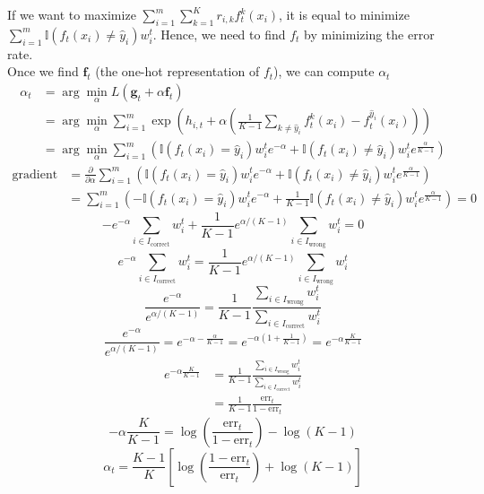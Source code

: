 \documentclass[12pt,a4paper]{article}
\begin{document}
If we want to maximize $\sum_{i=1}^{m}\sum_{k=1}^{K}r_{i,k}f_{t}^{k}(x_i)$, it is equal to minimize $\sum_{i=1}^{m} \mathbb{I} (f_{t}(x_i)\neq \hat{y}_{i})w_{i}^{t}$. 
Hence, we need to find $f_{t}$ by minimizing the error rate.\\
Once we find $\mathbf{f}_{t}$ (the one-hot representation of $f_{t}$), we can compute $\alpha_{t}$
\begin{equation*}
    \begin{split}
        \alpha_{t} 
            &= \arg\min_{\alpha} L(\mathbf{g}_{t}+\alpha\mathbf{f}_{t})\\
            &= \arg\min_{\alpha} \sum_{i=1}^{m} \exp\left(h_{i,t} + \alpha\left(\frac{1}{K-1}\sum_{k\neq \hat{y}_i}f_{t}^{k}(x_{i})-f_{t}^{\hat{y}_{i}}(x_{i})\right)\right)\\
            &= \arg\min_{\alpha} \sum_{i=1}^{m} (\mathbb{I} (f_{t}(x_{i}) = \hat{y}_{i})w_{i}^{t}e^{-\alpha} + \mathbb{I} (f_{t}(x_{i}) \neq \hat{y}_{i})w_{i}^{t}e^{\frac{\alpha}{K-1}})
    \end{split}
\end{equation*}
\begin{equation*}
    \begin{split}
        \text{gradient} 
            &= \frac{\partial}{\partial \alpha}\sum_{i=1}^{m} (\mathbb{I} (f_{t}(x_{i}) = \hat{y}_{i})w_{i}^{t}e^{-\alpha} + \mathbb{I} (f_{t}(x_{i}) \neq \hat{y}_{i})w_{i}^{t}e^{\frac{\alpha}{K-1}})\\
            &= \sum_{i=1}^{m} (-\mathbb{I} (f_{t}(x_{i}) = \hat{y}_{i})w_{i}^{t}e^{-\alpha} + \frac{1}{K-1}\mathbb{I} (f_{t}(x_{i}) \neq \hat{y}_{i})w_{i}^{t}e^{\frac{\alpha}{K-1}}) = 0
    \end{split}
\end{equation*}
\begin{equation*}
   - e^{-\alpha} \sum_{i \in I_{\text{correct}}} w_i^t + \frac{1}{K-1} e^{\alpha/(K-1)} \sum_{i \in I_{\text{wrong}}} w_i^t = 0 
\end{equation*}
$$e^{-\alpha} \sum_{i \in I_{\text{correct}}} w_i^t = \frac{1}{K-1} e^{\alpha/(K-1)} \sum_{i \in I_{\text{wrong}}} w_i^t $$
$$\frac{e^{-\alpha}}{e^{\alpha/(K-1)}} = \frac{1}{K-1} \frac{\sum_{i \in I_{\text{wrong}}} w_i^t}{\sum_{i \in I_{\text{correct}}} w_i^t} $$
$$\frac{e^{-\alpha}}{e^{\alpha/(K-1)}} = e^{-\alpha - \frac{\alpha}{K-1}} = e^{-\alpha \left( 1 + \frac{1}{K-1} \right)} = e^{-\alpha \frac{K}{K-1}} $$
\begin{equation*}
    \begin{split}
        e^{-\alpha \frac{K}{K-1}} 
            &= \frac{1}{K-1} \frac{\sum_{i \in I_{\text{wrong}}} w_i^t}{\sum_{i \in I_{\text{correct}}} w_i^t}\\
            &= \frac{1}{K-1} \frac{\text{err}_t}{1 - \text{err}_t}
    \end{split}
\end{equation*}
$$- \alpha \frac{K}{K-1} = \log \left( \frac{\text{err}_t}{1 - \text{err}_t} \right) - \log (K-1) $$
$$\alpha_t = \frac{K-1}{K} \left[ \log \left( \frac{1 - \text{err}_t}{\text{err}_t} \right) + \log (K-1) \right] $$
\end{document}
